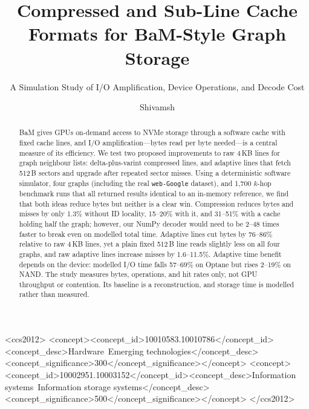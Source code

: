 \documentclass[sigconf,nonacm]{acmart}
\begin{document}
\title{Compressed and Sub-Line Cache Formats for BaM-Style Graph Storage}
\subtitle{A Simulation Study of I/O Amplification, Device Operations, and Decode Cost}

\author{Shivamsh}

\begin{abstract}
BaM gives GPUs on-demand access to NVMe storage through a software cache with fixed cache lines,
and I/O amplification---bytes read per byte needed---is a central measure of its efficiency.
We test two proposed improvements to raw 4\,KB lines for graph neighbour lists: delta-plus-varint
compressed lines, and adaptive lines that fetch 512\,B sectors and upgrade after repeated sector misses.
Using a deterministic software simulator, four graphs (including the real \texttt{web-Google} dataset),
and 1,700 $k$-hop benchmark runs that all returned results identical to an in-memory reference, we find
that both ideas reduce bytes but neither is a clear win.
Compression reduces bytes and misses by only 1.3\% without ID locality, 15--20\% with it, and 31--51\%
with a cache holding half the graph; however, our NumPy decoder would need to be 2--48 times faster to
break even on modelled total time.
Adaptive lines cut bytes by 76--86\% relative to raw 4\,KB lines, yet a plain fixed 512\,B line reads slightly
less on all four graphs, and raw adaptive lines increase misses by 1.6--11.5\%.
Adaptive time benefit depends on the device: modelled I/O time falls 57--69\% on Optane but rises 2--19\% on NAND.
The study measures bytes, operations, and hit rates only, not GPU throughput or contention. Its baseline is
a reconstruction, and storage time is modelled rather than measured.
\end{abstract}

\begin{CCSXML}
<ccs2012>
<concept><concept_id>10010583.10010786</concept_id><concept_desc>Hardware~Emerging technologies</concept_desc><concept_significance>300</concept_significance></concept>
<concept><concept_id>10002951.10003152</concept_id><concept_desc>Information systems~Information storage systems</concept_desc><concept_significance>500</concept_significance></concept>
</ccs2012>
\end{CCSXML}
\maketitle
\end{document}
